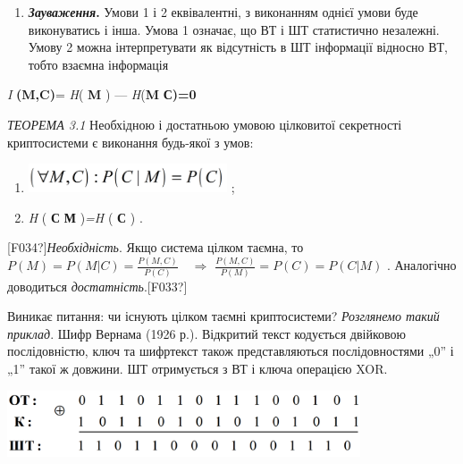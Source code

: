 \liststyleWWviiiNumxliii
\setcounter{saveenum}{\value{enumi}}
\begin{enumerate}
\setcounter{enumi}{\value{saveenum}}
\item \textbf{\textit{Зауваження}}\textbf{.} Умови 1 і 2 еквівалентні, з
виконанням  однієї умови буде виконуватись і інша. Умова 1 означає, що ВТ і ШТ
статистично незалежні. Умову 2 можна інтерпретувати як відсутність в ШТ
інформації відносно ВТ, тобто взаємна інформація  
\end{enumerate}
\textit{ } \textit{I}\textit{
}\textbf{(}\textbf{M}\textbf{,}\textbf{C}\textbf{)}=\textit{ H}( \textbf{M} ) ---
\textit{H}(\textbf{M} {\textbar} \textbf{С)=0}


\bigskip

\textit{ТЕОРЕМА 3.1 }Необхідною і достатньою умовою цілковитої секретності
криптосистеми є виконання будь-якої  з умов:

\liststyleWWviiiNumxi
\begin{enumerate}
\item 
\includegraphics[width=2.3146in,height=0.3346in]{crypt-img/crypt-img24.png} ;
\item \textit{ H }( \textbf{С}\textbf{ {\textbar} }\textbf{М} )\textit{=H }(
\textbf{С }) .
\end{enumerate}
\textlatin{[F034?]}\textit{Необхідність}. Якщо система цілком таємна, то 
$P(M)=P(M|C)=\frac{P(M,C)}{P(C)}$  $ $ $ $ $\Rightarrow$ 
$\frac{P(M,C)}{P(M)}=P(C)=P(C|M)$ .  Аналогічно доводиться
\textit{достатність}.\textlatin{[F033?]}


\bigskip

Виникає питання: чи існують цілком таємні криптосистеми? \textit{Розглянемо
такий приклад}. Шифр Вернама (1926 р.). Відкритий текст кодується двійковою
послідовністю, ключ та шифртекст  також представляються послідовностями  „0” і
„1” такої ж довжини. ШТ отримується з ВТ і ключа операцією XOR.


\bigskip

 \includegraphics[width=4.111in,height=0.778in]{crypt-img/crypt-img25.png} 


\bigskip

